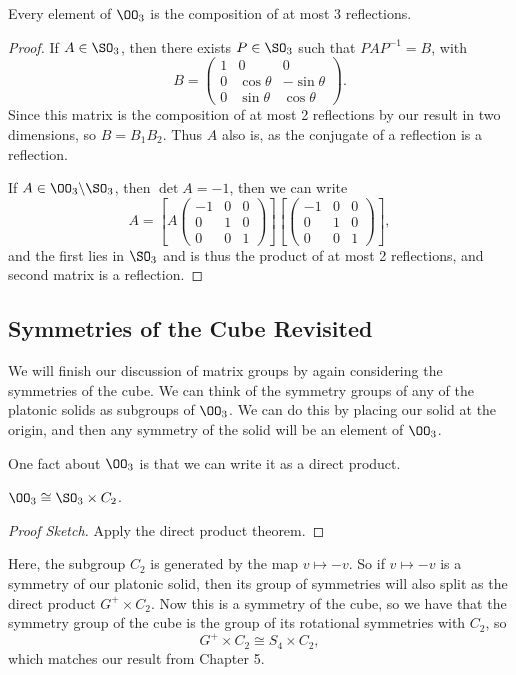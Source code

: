 \documentclass[a4paper]{scrartcl}
\newcommand{\newsection}{\subsection}
\begin{document}
\begin{corollary}
	Every element of $\OO_3$ is the composition of at most 3 reflections.
\end{corollary}
\begin{proof}
	If $A \in \SO_3$, then there exists $P \in \SO_3$ such that $PAP^{-1} = B$, with
	$$
	B = \begin{pmatrix}
		1 & 0 & 0 \\
		0 & \cos \theta & - \sin \theta \\
		0 & \sin \theta & \cos \theta
	\end{pmatrix}.
	$$
	Since this matrix is the composition of at most 2 reflections by our result in two dimensions, so $B = B_1 B_2$. Thus $A$ also is, as the conjugate of a reflection is a reflection.

	If $A \in \OO_3 \backslash \SO_3$, then $\det A = -1$, then we can write
	$$
	A = \left[A \begin{pmatrix}
		-1 & 0 & 0 \\
		0 & 1 & 0 \\
		0 & 0 & 1
	\end{pmatrix}\right] \left[\begin{pmatrix}
		-1 & 0 & 0 \\
		0 & 1 & 0 \\
		0 & 0 & 1
	\end{pmatrix}\right],
	$$
	and the first lies in $\SO_3$ and is thus the product of at most 2 reflections, and second matrix is a reflection.
\end{proof}



\newsection{Symmetries of the Cube Revisited}

We will finish our discussion of matrix groups by again considering the symmetries of the cube.
We can think of the symmetry groups of any of the platonic solids as subgroups of $\OO_3$. We can do this by placing our solid at the origin, and then any symmetry of the solid will be an element of $\OO_3$.

One fact about $\OO_3$ is that we can write it as a direct product.

\begin{lemma}
	$\OO_3 \cong \SO_3 \times C_2$.
\end{lemma}
\begin{proof}[Proof Sketch] Apply the direct product theorem.
\end{proof}

Here, the subgroup $C_2$ is generated by the map $v \mapsto -v$. So if $v \mapsto -v$ is a symmetry of our platonic solid, then its group of symmetries will also split as the direct product $G^+ \times C_2$. Now this is a symmetry of the cube, so we have that the symmetry group of the cube is the group of its rotational symmetries with $C_2$, so
$$
G^+ \times C_2 \cong S_4 \times C_2,
$$
which matches our result from Chapter 5.
\end{document}
